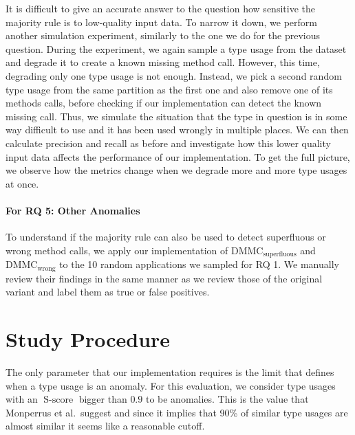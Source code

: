 It is difficult to give an accurate answer to the question how sensitive the majority rule is to low-quality input data.
To narrow it down, we perform another simulation experiment, similarly to the one we do for the previous question.
During the experiment, we again sample a type usage from the dataset and degrade it to create a known missing method call.
However, this time, degrading only one type usage is not enough.
Instead, we pick a second random type usage from the same partition as the first one and also remove one of its methods calls, before checking if our implementation can detect the known missing call.
Thus, we simulate the situation that the type in question is in some way difficult to use and it has been used wrongly in multiple places.
We can then calculate precision and recall as before and investigate how this lower quality input data affects the performance of our implementation.
To get the full picture, we observe how the metrics change when we degrade more and more type usages at once.

\paragraph{For RQ 5: Other Anomalies}

To understand if the majority rule can also be used to detect superfluous or wrong method calls, we apply our implementation of $\text{DMMC}_\text{superfluous}$ and $\text{DMMC}_\text{wrong}$ to the 10 random applications we sampled for RQ 1.
We manually review their findings in the same manner as we review those of the original variant and label them as true or false positives.

\section{Study Procedure}

The only parameter that our implementation requires is the limit that defines when a type usage is an anomaly.
For this evaluation, we consider type usages with an $\operatorname{S-score}$ bigger than $0.9$ to be anomalies.
This is the value that Monperrus et al.\ suggest and since it implies that 90\% of similar type usages are almost similar it seems like a reasonable cutoff.

